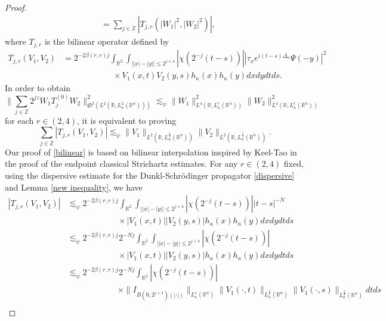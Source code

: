 \documentclass[a4paper,11pt, reqno]{amsart}
\numberwithin{equation}{section}
\theoremstyle{plain}
\theoremstyle{definition}
\theoremstyle{remark}
\begin{document}
\begin{proof}
\begin{align*}
&=\sum\limits_{j\in\mathbb{Z}} \left|T_{j,r}(|W_1|^2,|W_2|^2)\right|,
\end{align*}
where $T_{j,r}$ is the bilinear operator defined by
\begin{align*}
    T_{j,r}(V_1,V_2)&=2^{-2\beta(r,r)j}\int_{\mathbb{R}^2}\int_{\left||x|-|y|\right|\leq 2^{j+4}}|\chi\left(2^{-j}(t-s)\right)|\left|\tau_x e^{i(t-s)\Delta_\kappa} \Psi(-y)\right|^2\\
    &\qquad\qquad\qquad\times V_1(x,t) V_2(y,s)h_\kappa(x) h_\kappa(y)dxdydtds.
\end{align*}
In order to obtain
\begin{equation*}
 \big\|\sum\limits_{j\in\mathbb{Z}} 2^{jz}W_1T^{(0)}_jW_2\big\|^2_{\mathfrak{S}^{2}(L^2(\mathbb{R}, L_\kappa^2(\mathbb{R}^n)))} \lesssim_\psi \|W_1\|^2_{L^4(\mathbb{R},L^r_\kappa(\mathbb{R}^n))}\|W_2\|^2_{L^4(\mathbb{R},L^r_\kappa(\mathbb{R}^n))}
\end{equation*}
for each $r\in(2,4)$, it is equivalent to proving
\begin{equation}\label{bilinear}
\sum\limits_{j\in\mathbb{Z}} \left|T_{j,r}(V_1,V_2)\right|\lesssim_\psi \|V_1\|_{L^2(\mathbb{R},L^\frac{r}{2}_\kappa(\mathbb{R}^n))}\|V_2\|_{L^2(\mathbb{R},L^\frac{r}{2}_\kappa(\mathbb{R}^n))}.
\end{equation}
Our proof of \eqref{bilinear} is based on bilinear interpolation inspired by Keel-Tao \cite{KT} in the proof of the endpoint classical Strichartz estimates. For any $r\in (2,4)$ fixed, using the dispersive estimate for the Dunkl-Schr\"{o}dinger propagator \eqref{dispersive} and Lemma \ref{new inequality}, we have
\begin{align*}
    \left|T_{j,r}(V_1,V_2)\right|&\lesssim_\psi 2^{-2\beta(r,r)j}\int_{\mathbb{R}^2}\int_{\left||x|-|y|\right|\leq 2^{j+4}}|\chi\left(2^{-j}(t-s)\right)||t-s|^{-N}\\
    &\qquad\qquad\qquad\times |V_1(x,t)| |V_2(y,s)|h_\kappa(x) h_\kappa(y)dxdydtds\\
    &\lesssim_\psi 2^{-2\beta(r,r)j}2^{-Nj}\int_{\mathbb{R}^2}\int_{\left||x|-|y|\right|\leq 2^{j+4}}|\chi\left(2^{-j}(t-s)\right)|\\
    &\qquad\qquad\qquad\times |V_1(x,t)| |V_2(y,s)|h_\kappa(x) h_\kappa(y)dxdydtds\\
    &\lesssim_\psi 2^{-2\beta(r,r)j}2^{-Nj}\int_{\mathbb{R}^2}|\chi\left(2^{-j}(t-s)\right)|\\
    &\qquad\qquad\qquad\times \|I_{B(0,2^{j+4})(|\cdot|)}\|_{L^c_\kappa(\mathbb{R}^n)}\|V_1(\cdot,t)\|_{L^\frac{a}{2}_\kappa(\mathbb{R}^n)} \|V_1(\cdot,s)\|_{L^\frac{b}{2}_\kappa(\mathbb{R}^n)}dtds\\

\end{align*}
\end{proof}
\end{document}

